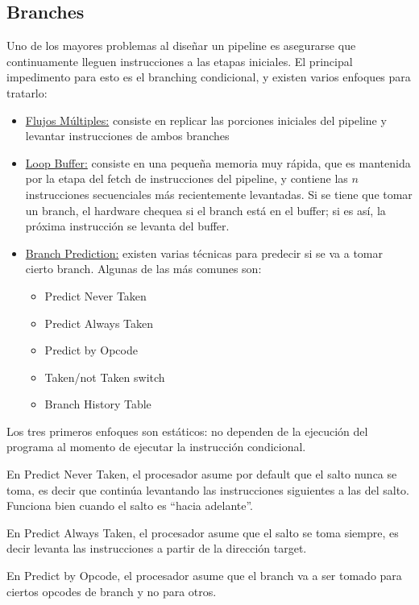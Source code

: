 \subsection{Branches}

Uno de los mayores problemas al dise\~nar un pipeline es asegurarse que continuamente lleguen instrucciones a las etapas iniciales. El principal
impedimento para esto es el branching condicional, y existen varios enfoques para tratarlo:

\begin{itemize}
 \item \underline{Flujos M\'ultiples:} consiste en replicar las porciones iniciales del pipeline y levantar instrucciones de ambos branches
 \item \underline{Loop Buffer:} consiste en una peque\~na memoria muy r\'apida, que es mantenida por la etapa del fetch de instrucciones del 
 pipeline, y contiene las $n$ instrucciones secuenciales m\'as recientemente levantadas. Si se tiene que tomar un branch, el hardware chequea si
 el branch est\'a en el buffer; si es as\'i, la pr\'oxima instrucci\'on se levanta del buffer.
 \item \underline{Branch Prediction:} existen varias t\'ecnicas para predecir si se va a tomar cierto branch. Algunas de las m\'as comunes son:
 \begin{itemize}
  \item Predict Never Taken
  \item Predict Always Taken
  \item Predict by Opcode
  \item Taken/not Taken switch
  \item Branch History Table
 \end{itemize}
\end{itemize}

Los tres primeros enfoques son est\'aticos: no dependen de la ejecuci\'on del programa al momento de ejecutar la instrucci\'on condicional.

En Predict Never Taken, el procesador asume por default que el salto nunca se toma, es decir que contin\'ua levantando las instrucciones siguientes
a las del salto. Funciona bien cuando el salto es ``hacia adelante''.

En Predict Always Taken, el procesador asume que el salto se toma siempre, es decir levanta las instrucciones a partir de la direcci\'on target.

En Predict by Opcode, el procesador asume que el branch va a ser tomado para ciertos opcodes de branch y no para otros.

